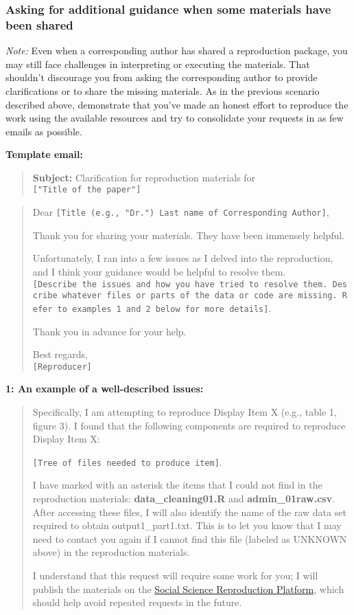 \subsubsection{Asking for additional guidance when some materials have
been shared}

\textit{Note:} Even when a corresponding author has shared a reproduction
package, you may still face challenges in interpreting or executing the
materials. That shouldn't discourage you from asking the corresponding
author to provide clarifications or to share the missing materials. As
in the previous scenario described above, demonstrate that you've made
an honest effort to reproduce the work using the available resources and
try to consolidate your requests in as few emails as possible.

\textbf{Template email:}

\begin{quote}
\textbf{Subject:} Clarification for reproduction materials for
\texttt{{[}"Title\ of\ the\ paper"{]}}
\end{quote}

\begin{quote}
Dear
\texttt{{[}Title\ (e.g.,\ "Dr.")\ Last\ name\ of\ Corresponding\ Author{]}},

Thank you for sharing your materials. They have been immensely helpful.

Unfortunately, I ran into a few issues as I delved into the
reproduction, and I think your guidance would be helpful to resolve
them.
\texttt{{[}Describe\ the\ issues\ and\ how\ you\ have\ tried\ to\ resolve\ them.\ Describe\ whatever\ files\ or\ parts\ of\ the\ data\ or\ code\ are\ missing.\ Refer\ to\ examples\ 1\ and\ 2\ below\ for\ more\ details{]}}.

Thank you in advance for your help.

Best regards,\\
\texttt{{[}Reproducer{]}}
\end{quote}

\textbf{1: An example of a well-described issues:}

\begin{quote}
Specifically, I am attempting to reproduce Display Item X (e.g., table 1, figure 3). I found that the following components are required to reproduce Display Item X:

\texttt{{[}Tree of files needed to produce item{]}}.

I have marked with an asterisk the items that I could not find in the
reproduction materials: \textbf{data\_cleaning01.R} and
\textbf{admin\_01raw.csv}. After accessing these files, I will also
identify the name of the raw data set required to obtain
output1\_part1.txt. This is to let you know that I may need to contact
you again if I cannot find this file (labeled as UNKNOWN above) in the
reproduction materials.

I understand that this request will require some work for you; I will
publish the materials on the
\href{https://www.socialsciencereproduction.org/}{Social Science
Reproduction Platform}, which should help avoid repeated requests in the
future.
\end{quote}

